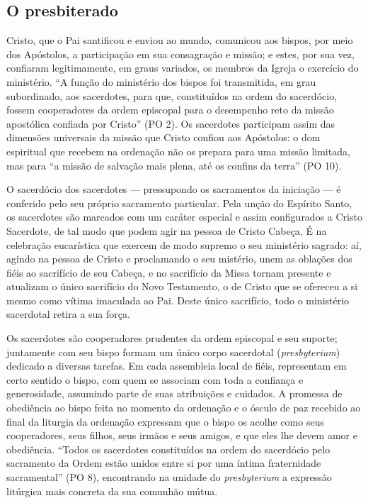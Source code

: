 \subsection*{O presbiterado}

Cristo, que o Pai santificou e enviou ao mundo, comunicou aos bispos, por meio dos Apóstolos, a participação em sua consagração e missão; e estes, por sua vez, confiaram legitimamente, em graus variados, os membros da Igreja o exercício do ministério. ``A função do ministério dos bispos foi transmitida, em grau subordinado, aos sacerdotes, para que, constituídos na ordem do sacerdócio, fossem cooperadores da ordem episcopal para o desempenho reto da missão apostólica confiada por Cristo'' (PO 2). Os sacerdotes participam assim das dimensões universais da missão que Cristo confiou aos Apóstolos: o dom espiritual que recebem na ordenação não os prepara para uma missão limitada, mas para ``a missão de salvação mais plena, até os confins da terra'' (PO 10).

O sacerdócio dos sacerdotes --- pressupondo os sacramentos da iniciação --- é conferido pelo seu próprio sacramento particular. Pela unção do Espírito Santo, os sacerdotes são marcados com um caráter especial e assim configurados a Cristo Sacerdote, de tal modo que podem agir na pessoa de Cristo Cabeça. É na celebração eucarística que exercem de modo supremo o seu ministério sagrado: aí, agindo na pessoa de Cristo e proclamando o seu mistério, unem as oblações dos fiéis ao sacrifício de seu Cabeça, e no sacrifício da Missa tornam presente e atualizam o único sacrifício do Novo Testamento, o de Cristo que se ofereceu a si mesmo como vítima imaculada ao Pai. Deste único sacrifício, todo o ministério sacerdotal retira a sua força.

Os sacerdotes são cooperadores prudentes da ordem episcopal e seu suporte; juntamente com seu bispo formam um único corpo sacerdotal (\textit{presbyterium}) dedicado a diversas tarefas. Em cada assembleia local de fiéis, representam em certo sentido o bispo, com quem se associam com toda a confiança e generosidade, assumindo parte de suas atribuições e cuidados. A promessa de obediência ao bispo feita no momento da ordenação e o ósculo de paz recebido ao final da liturgia da ordenação expressam que o bispo os acolhe como seus cooperadores, seus filhos, seus irmãos e seus amigos, e que eles lhe devem amor e obediência. ``Todos os sacerdotes constituídos na ordem do sacerdócio pelo sacramento da Ordem estão unidos entre si por uma íntima fraternidade sacramental'' (PO 8), encontrando na unidade do \textit{presbyterium} a expressão litúrgica mais concreta da sua comunhão mútua.

